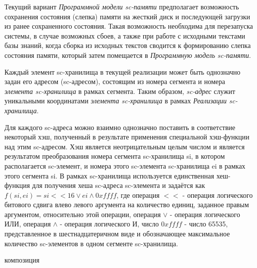 Текущий вариант \textit{Программной модели sc-памяти} предполагает возможность сохранения состояния (слепка) памяти
на жесткий диск и последующей загрузки из ранее сохраненного состояния. Такая возможность необходима для перезапуска
системы, в случае возможных сбоев, а также при работе с исходными текстами базы знаний, когда сборка из исходных текстов
сводится к формированию слепка состояния памяти, который затем помещается в \textit{Программную модель sc-памяти}.

Каждый элемент sc-хранилища в текущей реализации может быть однозначно задан его адресом (sc-адресом), состоящим из
номера сегмента и номера \textit{элемента sc-хранилища} в рамках сегмента. Таким образом, \textit{sc-адрес} служит
уникальными координатами \textit{элемента sc-хранилища} в рамках \textit{Реализации sc-хранилища}.

Для каждого sc-адреса можно взаимно однозначно поставить в соответствие некоторый хэш, полученный в результате применения
специальной хэш-функции над этим sc-адресом. Хэш является неотрицательным целым числом и является результатом
преобразования номера сегмента sc-хранилища si, в котором располагается sc-элемент, и номера этого sc-элемента
sc-хранилища ei в рамках этого сегмента si. В рамках sc-хранилища используется единственная хеш-функция для
получения хеша sc-адреса sc-элемента и задаётся как $f(si, ei) = si << 16 \vee ei \wedge 0xffff$, где операция $<<$ -
операция логического битового сдвига влево левого аргумента на количество единиц, заданное правым аргументом, относительно
этой операции, операция $\vee$ - операция логического ИЛИ, операция $\wedge$ - операция логического И, число $0xffff$ -
число 65535, представленное в шестнадцатеричном виде и обозначающее максимальное количество sc-элементов в одном сегменте
sc-хранилища.


\begin{SCn}
\begin{scnreltovector}{композиция}
    \begin{scnindent}
    \end{scnindent}
    \scnnonamednode
    \begin{scnindent}
        \begin{scnindent}
        \end{scnindent}
    \end{scnindent}
\end{scnreltovector}
\end{SCn}

